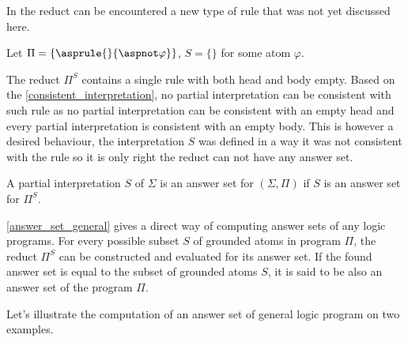     In the reduct can be encountered a new type of rule that was not yet discussed here.

\begin{example}
    Let $\Pi = \{\asprule{}{\aspnot \varphi}\}$, $S = \{\}$ for some atom $\varphi$.
    
    The reduct $\Pi^S$ contains
    a single rule with both head and body empty.
    Based on the \cref{consistent_interpretation},
    no partial interpretation can be consistent
    with such rule as no partial interpretation can be consistent with an empty head
    and every partial interpretation is consistent with an empty body.
    This is however a desired behaviour, the interpretation $S$ was defined
    in a way it was not consistent with the rule so it is only right
    the reduct can not have any answer set.
\end{example}

\begin{definition}%
    \label{answer_set_general}
    A partial interpretation $S$ of $\Sigma$ is an answer set for $(\Sigma, \Pi)$
    if $S$ is an answer set for $\Pi^S$.
\end{definition}

\cref{answer_set_general} gives a direct way of computing answer sets
of any logic programs. For every possible subset $S$ of grounded atoms in program $\Pi$,
the reduct $\Pi^S$ can be constructed and evaluated for its answer set.
If the found answer set is equal to the subset of grounded atoms $S$, it is said
to be also an answer set of the program $\Pi$.

Let's illustrate the computation of an answer set of general logic program on two examples.

